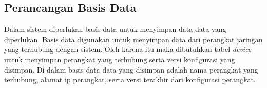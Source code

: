          \subsection{Perancangan Basis Data}
         Dalam sistem diperlukan basis data untuk menyimpan data-data yang diperlukan. Basis data digunakan untuk menyimpan data dari perangkat jaringan yang terhubung dengan sistem. Oleh karena itu maka dibutuhkan tabel \textit{device} untuk menyimpan perangkat yang terhubung serta versi konfigurasi yang disimpan. Di dalam basis data data yang disimpan adalah nama perangkat yang terhubung, alamat ip perangkat, serta versi terakhir dari konfigurasi perangkat.
        
       
            
        